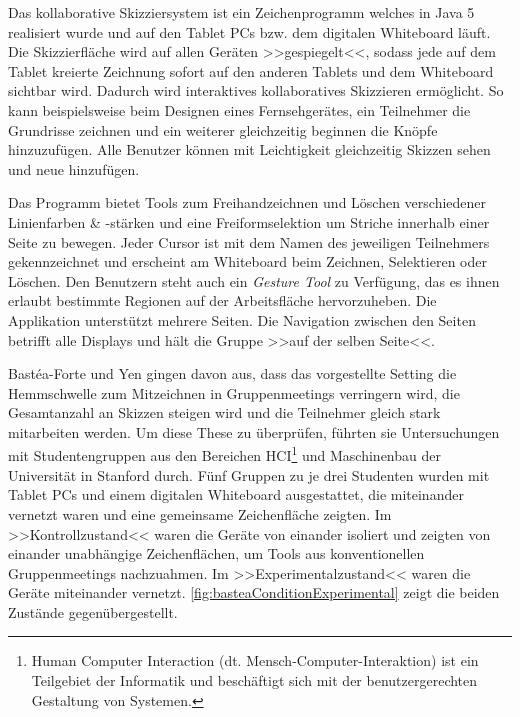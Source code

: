 \medskip Das kollaborative Skizziersystem ist ein Zeichenprogramm welches in Java 5 realisiert wurde und auf den Tablet PCs bzw. dem digitalen Whiteboard läuft. Die Skizzierfläche wird auf allen Geräten >>gespiegelt<<, sodass jede auf dem Tablet kreierte Zeichnung sofort auf den anderen Tablets und dem Whiteboard sichtbar wird. Dadurch wird interaktives kollaboratives Skizzieren ermöglicht. So kann beispielsweise beim Designen eines Fernsehgerätes, ein Teilnehmer die Grundrisse zeichnen und ein weiterer gleichzeitig beginnen die Knöpfe hinzuzufügen. Alle Benutzer können mit Leichtigkeit gleichzeitig Skizzen sehen und neue hinzufügen. 

\medskip Das Programm bietet Tools zum Freihandzeichnen und Löschen verschiedener Linienfarben \& -stärken und eine Freiformselektion um Striche innerhalb einer Seite zu bewegen. Jeder Cursor ist mit dem Namen des jeweiligen Teilnehmers gekennzeichnet und erscheint am Whiteboard beim Zeichnen, Selektieren oder Löschen. Den Benutzern steht auch ein \emph{Gesture Tool} zu Verfügung, das es ihnen erlaubt bestimmte Regionen auf der Arbeitsfläche hervorzuheben. Die Applikation unterstützt mehrere Seiten. Die Navigation zwischen den Seiten betrifft alle Displays und hält die Gruppe >>auf der selben Seite<<.

\medskip Bastéa-Forte und Yen gingen davon aus, dass das vorgestellte Setting die Hemmschwelle zum Mitzeichnen in Gruppenmeetings verringern wird, die Gesamtanzahl an Skizzen steigen wird und die Teilnehmer gleich stark mitarbeiten werden. Um diese These zu überprüfen, führten sie Untersuchungen mit Studentengruppen aus den Bereichen \ac{HCI}\footnote{Human Computer Interaction (dt. Mensch-Computer-Interaktion) ist ein Teilgebiet der Informatik und beschäftigt sich mit der benutzergerechten Gestaltung von Systemen.} und Maschinenbau der Universität in Stanford durch. Fünf Gruppen zu je drei Studenten wurden mit Tablet PCs und einem digitalen Whiteboard ausgestattet, die miteinander vernetzt waren und eine gemeinsame Zeichenfläche zeigten. Im >>Kontrollzustand<< waren die Geräte von einander isoliert und zeigten von einander unabhängige Zeichenflächen, um Tools aus konventionellen Gruppenmeetings nachzuahmen. Im >>Experimentalzustand<< waren die Geräte miteinander vernetzt. \autoref{fig:basteaConditionExperimental} zeigt die beiden Zustände gegenübergestellt.


